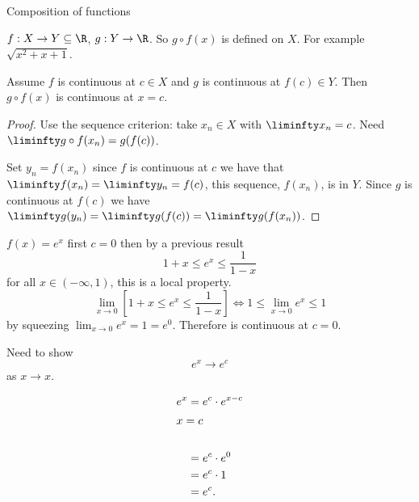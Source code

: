 \documentclass[10pt, a4paper]{article}
\begin{document}
Composition of functions

$f : X \to Y \subseteq \R$,
$g : Y \to \R$.
So $g \circ f(x)$ is defined on $X$.
For example $\sqrt{x ^ 2 + x + 1}$.

\begin{proposition}
    Assume $f$ is continuous at $c \in X$ and $g$ is continuous at $f(c) \in Y$.
    Then $g \circ f(x)$ is continuous at $x = c$.
    \begin{proof}
        Use the sequence criterion:
        take $x_n \in X$ with $\liminfty x_n = c$.
        Need $\liminfty g \circ f(x_n) = g(f(c))$.
        
        Set $y_n = f(x_n)$ since $f$ is continuous at $c$ we have that $\liminfty f(x_n) = \liminfty y_n = f(c)$,
        this sequence,
        $f(x_n)$,
        is in $Y$.
        Since $g$ is continuous at $f(c)$ we have $\liminfty g(y_n) = \liminfty g(f(c)) = \liminfty g(f(x_n))$.
    \end{proof}
\end{proposition}

\begin{example}
    $f(x) = e ^ x$ first $c = 0$ then by a previous result
    \[
    1 + x \leq e ^ x \leq \frac{1}{1 - x}
    \]
    for all $x \in (-\infty, 1)$,
    this is a local property.
    \[
    \lim_{x \to 0}\left[1 + x \leq e ^ x \leq \frac{1}{1 - x}\right] \iff 1 \leq \lim_{x \to 0}e ^ x \leq 1
    \]
    by squeezing $\lim_{x \to 0}e ^ x = 1 = e ^ 0$.
    Therefore is continuous at $c = 0$.

    Need to show
    \[
    e ^ x \to e ^ c
    \]
    as $x \to x$.

    \begin{align*}
        e ^ x &= e ^ c \cdot e ^ {x - c} \\
        \intertext{$x = c$} \\
        &= e ^ c \cdot e ^ 0 \\
        &= e ^ c \cdot 1 \\
        &= e ^ c.
    \end{align*}
\end{example}
\end{document}
